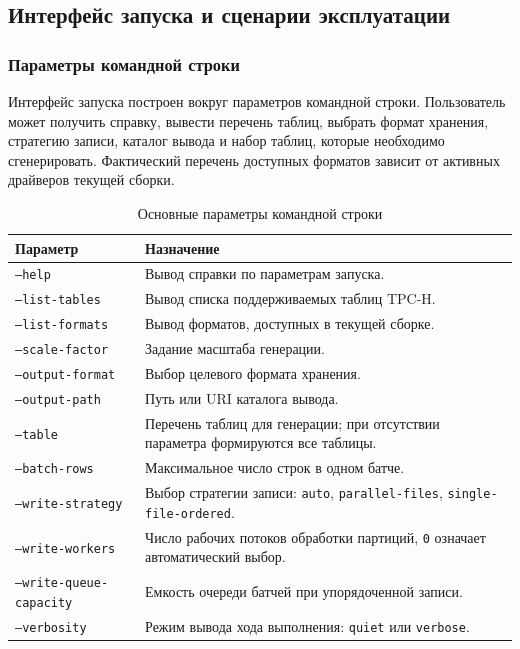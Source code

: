 \subsection{Интерфейс запуска и сценарии эксплуатации}

\subsubsection{Параметры командной строки}

Интерфейс запуска построен вокруг параметров командной строки. Пользователь
может получить справку, вывести перечень таблиц, выбрать формат хранения,
стратегию записи, каталог вывода и набор таблиц, которые необходимо
сгенерировать. Фактический перечень доступных форматов зависит от активных
драйверов текущей сборки.

\begin{table}[H]
\caption{Основные параметры командной строки}
\label{tab:chapter3-cli-options}
\centering
\small
\begin{tabularx}{\textwidth}{|p{}|X|}
\hline
\textbf{Параметр} & \textbf{Назначение} \\
\hline
\texttt{--help} & Вывод справки по параметрам запуска. \\
\hline
\texttt{--list-tables} & Вывод списка поддерживаемых таблиц TPC-H. \\
\hline
\texttt{--list-formats} & Вывод форматов, доступных в текущей сборке. \\
\hline
\texttt{--scale-factor} & Задание масштаба генерации. \\
\hline
\texttt{--output-format} & Выбор целевого формата хранения. \\
\hline
\texttt{--output-path} & Путь или URI каталога вывода. \\
\hline
\texttt{--table} & Перечень таблиц для генерации; при отсутствии параметра формируются все таблицы. \\
\hline
\texttt{--batch-rows} & Максимальное число строк в одном батче. \\
\hline
\texttt{--write-strategy} & Выбор стратегии записи: \texttt{auto}, \texttt{parallel-files}, \texttt{single-file-ordered}. \\
\hline
\texttt{--write-workers} & Число рабочих потоков обработки партиций, \texttt{0} означает автоматический выбор. \\
\hline
\texttt{--write-queue-capacity} & Емкость очереди батчей при упорядоченной записи. \\
\hline
\texttt{--verbosity} & Режим вывода хода выполнения: \texttt{quiet} или \texttt{verbose}. \\
\hline
\end{tabularx}
\normalsize
\end{table}

